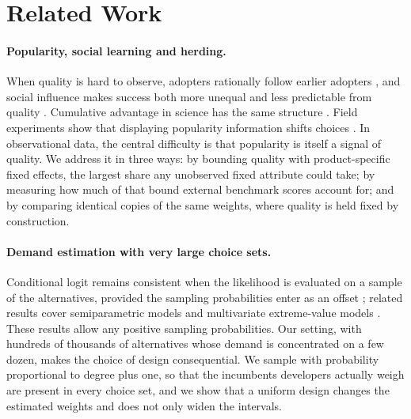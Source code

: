 \section{Related Work}
\label{sec:related}

\paragraph{Popularity, social learning and herding.}
When quality is hard to observe, adopters rationally follow earlier adopters
\citep{banerjee1992simple,bikhchandani1992theory}, and social influence makes success both more unequal and less
predictable from quality \citep{salganik2006experimental}. Cumulative advantage in science has the same structure
\citep{merton1968matthew}. Field experiments show that displaying popularity information shifts choices
\citep{cai2009observational,tucker2011popularity}. In observational data, the central difficulty is that popularity
is itself a signal of quality. We address it in three ways: by bounding quality with product-specific fixed effects,
the largest share any unobserved fixed attribute could take; by measuring how much of that bound external benchmark
scores account for; and by comparing identical copies of the same weights, where quality is held fixed by
construction.

\paragraph{Demand estimation with very large choice sets.}
Conditional logit \citep{mcfadden1974conditional,train2009discrete} remains consistent when the likelihood is
evaluated on a sample of the alternatives, provided the sampling probabilities enter as an offset
\citep{mcfadden1978modelling}; related results cover semiparametric models \citep{fox2007semiparametric} and
multivariate extreme-value models \citep{guevara2013sampling}. These results allow any positive sampling
probabilities. Our setting, with hundreds of thousands of alternatives whose demand is concentrated on a few dozen,
makes the choice of design consequential. We sample with probability proportional to degree plus one, so that the
incumbents developers actually weigh are present in every choice set, and we show that a uniform design changes the
estimated weights and does not only widen the intervals.

